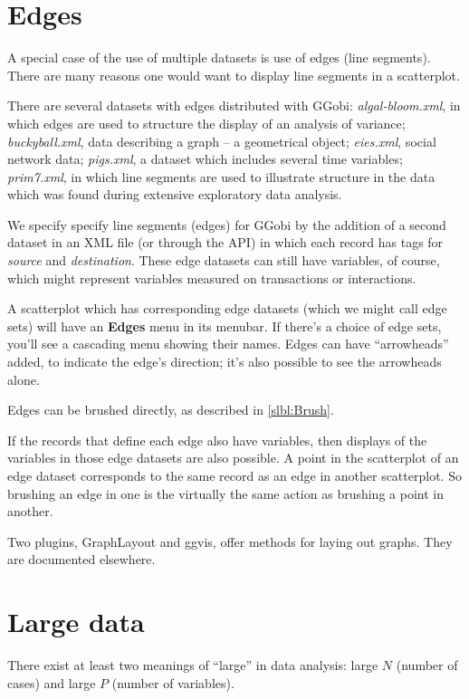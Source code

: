 \documentclass[11pt]{article}
\def\Widget#1{\textbf{#1}}
\def\File#1{\textsl{#1}}
\begin{document}
{\section{Edges}

A special case of the use of multiple datasets is use of edges (line
segments).  There are many reasons one would want to display line segments
in a scatterplot. 

There are several datasets with edges distributed with GGobi:
\File{algal-bloom.xml}, in which edges are used to structure the
display of an analysis of variance; \File{buckyball.xml}, data
describing a graph -- a geometrical object; \File{eies.xml}, social
network data; \File{pigs.xml}, a dataset which includes several time
variables; \File{prim7.xml}, in which line segments are used to
illustrate structure in the data which was found during extensive
exploratory data analysis.

We specify specify line segments (edges) for GGobi by the addition of a
second dataset in an XML file (or through the API) in which each record
has tags for {\it source} and {\it destination}.  These edge datasets
can still have variables, of course, which might represent variables
measured on transactions or interactions.

A scatterplot which has corresponding edge datasets (which we might call
edge sets) will have an \Widget{Edges} menu in its menubar.  If there's a
choice of edge sets, you'll see a cascading menu showing their names.
Edges can have ``arrowheads'' added, to indicate the edge's direction;
it's also possible to see the arrowheads alone.

Edges can be brushed directly, as described in \ref{slbl:Brush}.

If the records that define each edge also have variables, then
displays of the variables in those edge datasets are also possible.
A point in the scatterplot of an edge dataset corresponds to the
same record as an edge in another scatterplot.  So brushing an
edge in one is the virtually the same action as brushing a point
in another.

Two plugins, GraphLayout and ggvis, offer methods for laying out
graphs.  They are documented elsewhere.

\section{Large data}

There exist at least two meanings of ``large'' in data analysis: large
$N$ (number of cases) and large $P$ (number of variables).  

}
\end{document}
